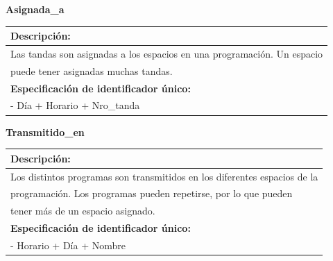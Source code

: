 \documentclass[a4paper,10pt]{article}
\begin{document}
    \begin{flushleft}
      \begin{large} \bf{Asignada\_a} \end{large}
    \end{flushleft}
      \begin{tabular}{| p{2cm} | p{9cm} |}
	\hline
	\multicolumn{2}{|l|}{\bf{Descripci\'on:}} \\
	\hline
	\multicolumn{2}{|l|}{Las tandas son asignadas a los espacios en una programaci\'on. Un espacio} \\
	\multicolumn{2}{|l|}{puede tener asignadas muchas tandas.} \\	
	\hline	
	\multicolumn{2}{|l|}{\bf{Especificaci\'on de identificador \'unico:}} \\
	\hline
	\multicolumn{2}{|l|}{- D\'ia + Horario + Nro\_tanda} \\
	\hline
      \end{tabular} 
   
    \begin{flushleft}
      \begin{large} \bf{Transmitido\_en} \end{large}
    \end{flushleft}
      \begin{tabular}{| p{2cm} | p{9cm} |}
	\hline
	\multicolumn{2}{|l|}{\bf{Descripci\'on:}} \\
	\hline
	\multicolumn{2}{|l|}{Los distintos programas son transmitidos en los diferentes espacios de la } \\
	\multicolumn{2}{|l|}{programaci\'on. Los programas pueden repetirse, por lo que pueden } \\	
	\multicolumn{2}{|l|}{tener m\'as de un espacio asignado.} \\	
	\hline	
	\multicolumn{2}{|l|}{\bf{Especificaci\'on de identificador \'unico:}} \\
	\hline
	\multicolumn{2}{|l|}{- Horario + D\'ia + Nombre} \\
	\hline
      \end{tabular}
       
\end{document}
